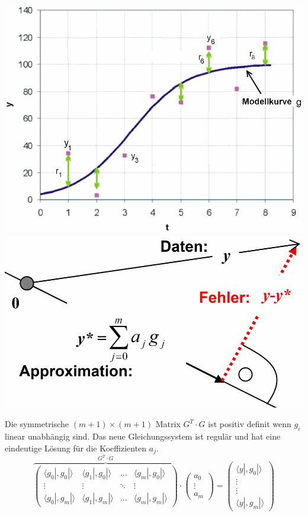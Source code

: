 \begin{minipage}[c]{6.5cm}
\includegraphics[width=\textwidth]{bilder/leastSquare}\\

\includegraphics[width=1\textwidth,trim=-3cm 0cm 0cm 0cm]{bilder/leastSquareOrth}
\end{minipage}

Die symmetrische $(m+1)\times(m+1)$ Matrix $G^T \cdot G$ ist positiv definit wenn $g_i$ linear unabhängig sind.
Das neue Gleichungssystem ist regulär und hat eine eindeutige Lösung für die Koeffizienten $a_j$.
\[
    \overbrace{
    \begin{pmatrix}
        \langle g_0|,g_0|\rangle & \langle g_1|,g_0|\rangle & \ldots & \langle g_m|,g_0|\rangle \\
        \vdots & \vdots & \ddots & \vdots \\
        \langle g_0|,g_m|\rangle & \langle g_1|,g_m|\rangle & \ldots & \langle g_m|,g_m|\rangle
    \end{pmatrix}
    }^{G^T \cdot G}
    \cdot
    \begin{pmatrix}
        a_0 \\ \vdots \\ a_m
    \end{pmatrix}
    =
    \begin{pmatrix}
        \langle y|,g_0 |\rangle \\ \vdots \\ \vdots \\ \langle y|,g_m| \rangle
    \end{pmatrix}
\]

